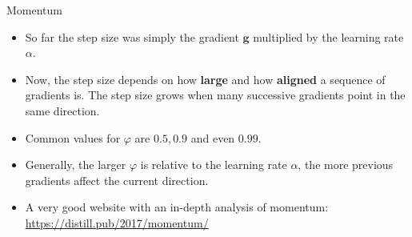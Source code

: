 \begin{vbframe}{Momentum}
  \begin{itemize}
    \item So far the step size was simply the gradient $\mathbf{g}$ multiplied by the learning rate $\alpha$.
    \item Now, the step size depends on how \textbf{large} and how \textbf{aligned} a sequence of gradients is. The step size grows when many successive gradients point in the same direction.
    \item Common values for $\varphi$ are $0.5, 0.9$ and even $0.99$.
    \item Generally, the larger $\varphi$ is relative to the learning rate $\alpha$, the more previous gradients affect the current direction.
    \item A very good website with an in-depth analysis of momentum: \url{https://distill.pub/2017/momentum/}

\end{itemize}
\end{vbframe}

